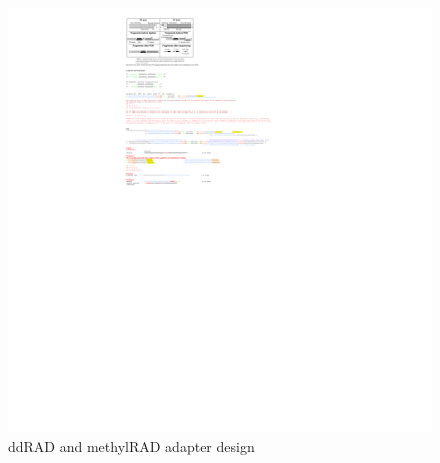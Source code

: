 \documentclass[11pt, oneside]{article}
\begin{document}
		\begin{figure}[h]
			\hspace*{-0.75in}
			\includegraphics[width = 8in]{./images/20160109_ddRAD_methylRAD_Lotterhos_design.pdf}
			\caption{ddRAD and methylRAD adapter design}
		\end{figure}

		\vspace{5mm}
	\clearpage
	\newpage 
	
\end{document}
